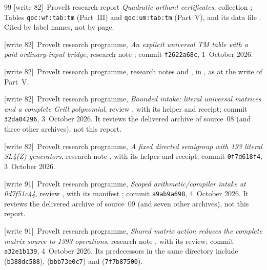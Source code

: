 \documentclass[11pt,letterpaper]{article}
\theoremstyle{definition}
\theoremstyle{remark}
\newcommand{\wtagc}{\textup{[write 82]}}
\newcommand{\wtagd}{\textup{[write 91]}}
\begin{document}
\begin{thebibliography}{99}
\wtagc\ ProveIt research report \emph{Quadratic orthant certificates}, collection ; Tables \texttt{qoc:wf:tab:tm} (Part~III) and \texttt{qoc:um:tab:tm} (Part~V), and its data file . Cited by label names, not by page.

\wtagc\ ProveIt research programme, \emph{An explicit universal TM table with a paid ordinary-input bridge}, research note ; commit \texttt{f2622a68c}, 1~October 2026.

\wtagc\ ProveIt research programme, research notes  and , in , as at the write of Part~V.

\wtagc\ ProveIt research programme, \emph{Bounded intake: literal universal matrices and a complete Grill polynomial}, review , with its helper and receipt; commit \texttt{32da04296}, 3~October 2026. It reviews the delivered archive of source~08 (and three other archives), not this report.

\wtagc\ ProveIt research programme, \emph{A fixed directed semigroup with 193 literal SL4(Z) generators}, research note , with its helper and receipt; commit \texttt{0f7d618f4}, 3~October 2026.

\wtagd\ ProveIt research programme, \emph{Scoped arithmetic/compiler intake at 0d7f51c44}, review , with its manifest ; commit \texttt{a9ab9a698}, 4~October 2026. It reviews the delivered archive of source~09 (and seven other archives), not this report.

\wtagd\ ProveIt research programme, \emph{Shared matrix action reduces the complete matrix source to 1393 operations}, research note , with its review; commit \texttt{a32e1b139}, 4~October 2026. Its predecessors in the same directory include  (\texttt{b388dc588}),  (\texttt{bbb73e0c7}) and  (\texttt{7f7b87500}).


\end{thebibliography}
\end{document}
